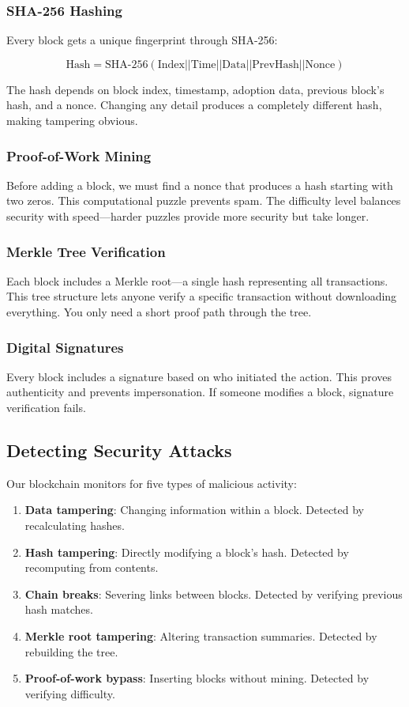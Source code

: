 \documentclass[conference]{IEEEtran}
\begin{document}
\subsubsection{SHA-256 Hashing}
Every block gets a unique fingerprint through SHA-256:

\begin{equation}
\text{Hash} = \text{SHA-256}(\text{Index} || \text{Time} || \text{Data} || \text{PrevHash} || \text{Nonce})
\end{equation}

The hash depends on block index, timestamp, adoption data, previous block's hash, and a nonce. Changing any detail produces a completely different hash, making tampering obvious.

\subsubsection{Proof-of-Work Mining}
Before adding a block, we must find a nonce that produces a hash starting with two zeros. This computational puzzle prevents spam. The difficulty level balances security with speed—harder puzzles provide more security but take longer.

\subsubsection{Merkle Tree Verification}
Each block includes a Merkle root—a single hash representing all transactions. This tree structure lets anyone verify a specific transaction without downloading everything. You only need a short proof path through the tree.

\subsubsection{Digital Signatures}
Every block includes a signature based on who initiated the action. This proves authenticity and prevents impersonation. If someone modifies a block, signature verification fails.

\subsection{Detecting Security Attacks}

Our blockchain monitors for five types of malicious activity:

\begin{enumerate}
\item \textbf{Data tampering}: Changing information within a block. Detected by recalculating hashes.
\item \textbf{Hash tampering}: Directly modifying a block's hash. Detected by recomputing from contents.
\item \textbf{Chain breaks}: Severing links between blocks. Detected by verifying previous hash matches.
\item \textbf{Merkle root tampering}: Altering transaction summaries. Detected by rebuilding the tree.
\item \textbf{Proof-of-work bypass}: Inserting blocks without mining. Detected by verifying difficulty.
\end{enumerate}
\end{document}
